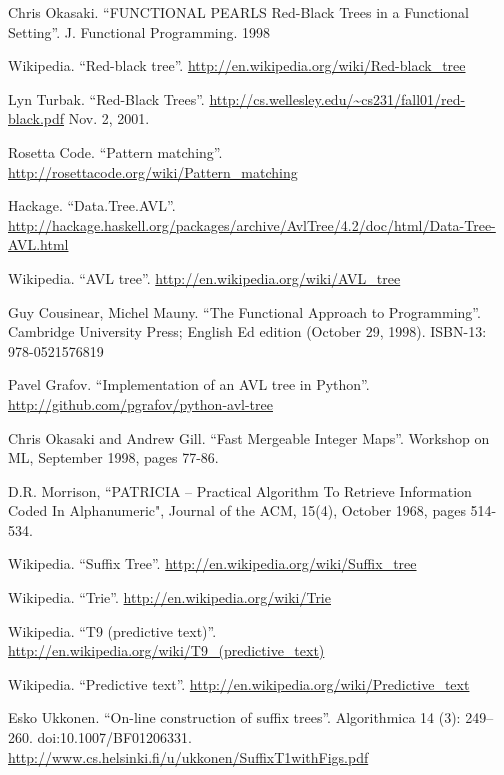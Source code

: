 \documentclass[b5paper]{ctexart}
\begin{document}
\begin{thebibliography}{99}
Chris Okasaki. ``FUNCTIONAL PEARLS Red-Black Trees in a Functional Setting''. J. Functional Programming. 1998

Wikipedia. ``Red-black tree''. \url{http://en.wikipedia.org/wiki/Red-black_tree}

Lyn Turbak. ``Red-Black Trees''. \url{http://cs.wellesley.edu/~cs231/fall01/red-black.pdf} Nov. 2, 2001.

Rosetta Code. ``Pattern matching''. \url{http://rosettacode.org/wiki/Pattern_matching}

Hackage. ``Data.Tree.AVL''. \url{http://hackage.haskell.org/packages/archive/AvlTree/4.2/doc/html/Data-Tree-AVL.html}

Wikipedia. ``AVL tree''. \url{http://en.wikipedia.org/wiki/AVL_tree}

Guy Cousinear, Michel Mauny. ``The Functional Approach to Programming''. Cambridge University Press; English Ed edition (October 29, 1998). ISBN-13: 978-0521576819

Pavel Grafov. ``Implementation of an AVL tree in Python''. \url{http://github.com/pgrafov/python-avl-tree}


Chris Okasaki and Andrew Gill. ``Fast Mergeable Integer Maps''. Workshop on ML, September 1998, pages 77-86.

D.R. Morrison, ``PATRICIA -- Practical Algorithm To Retrieve  Information Coded In Alphanumeric", Journal of the ACM, 15(4), October 1968, pages 514-534.

Wikipedia. ``Suffix Tree''. \url{http://en.wikipedia.org/wiki/Suffix_tree}

Wikipedia. ``Trie''. \url{http://en.wikipedia.org/wiki/Trie}

Wikipedia. ``T9 (predictive text)''. \url{http://en.wikipedia.org/wiki/T9_(predictive_text)}

Wikipedia. ``Predictive text''. \url{http://en.wikipedia.org/wiki/Predictive_text}


Esko Ukkonen. ``On-line construction of suffix trees''. Algorithmica 14 (3): 249--260. doi:10.1007/BF01206331. \url{http://www.cs.helsinki.fi/u/ukkonen/SuffixT1withFigs.pdf}


\end{thebibliography}
\end{document}
